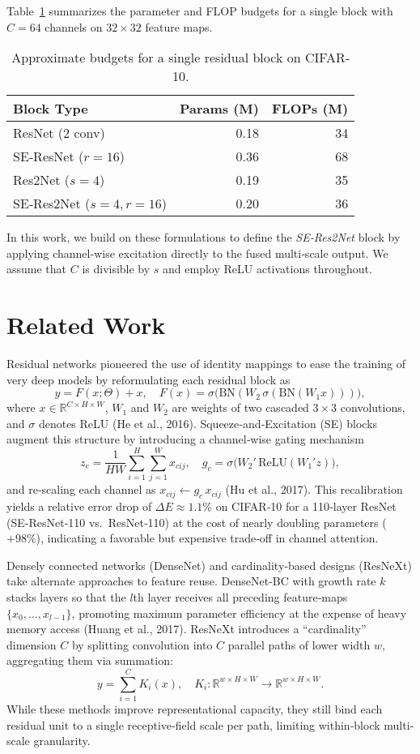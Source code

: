 \documentclass{article}
\begin{document}
Table~\ref{tab:budgets} summarizes the parameter and FLOP budgets for a single block with \(C=64\) channels on \(32\times32\) feature maps.

\begin{table}[h]
\centering
\begin{tabular}{lrr}
\hline
Block Type             & Params (M) & FLOPs (M) \\
\hline
ResNet (2 conv)        & 0.18       & 34        \\
SE‐ResNet (\(r=16\))   & 0.36       & 68        \\
Res2Net (\(s=4\))      & 0.19       & 35        \\
SE‐Res2Net (\(s=4,r=16\)) & 0.20    & 36        \\
\hline
\end{tabular}
\caption*{Approximate budgets for a single residual block on CIFAR‐10.}
\label{tab:budgets}
\end{table}

In this work, we build on these formulations to define the \emph{SE‐Res2Net} block by applying channel‐wise excitation directly to the fused multi‐scale output.  We assume that \(C\) is divisible by \(s\) and employ ReLU activations throughout.

\section{Related Work}
Residual networks pioneered the use of identity mappings to ease the training of very deep models by reformulating each residual block as
\[
y = F(x; \Theta) + x,\quad F(x)=\sigma\bigl(\mathrm{BN}(W_2\,\sigma(\mathrm{BN}(W_1 x)))\bigr),
\]
where \(x\in\mathbb{R}^{C\times H\times W}\), \(W_1\) and \(W_2\) are weights of two cascaded \(3\times3\) convolutions, and \(\sigma\) denotes ReLU (He et al., 2016).  Squeeze‐and‐Excitation (SE) blocks augment this structure by introducing a channel‐wise gating mechanism
\[
z_c = \frac{1}{H W}\sum_{i=1}^H\sum_{j=1}^W x_{cij},\quad g_c=\sigma\bigl(W_2'\,\mathrm{ReLU}(W_1'z)\bigr),
\]
and re‐scaling each channel as \(x_{cij}\leftarrow g_c\,x_{cij}\) (Hu et al., 2017).  This recalibration yields a relative error drop of \(\Delta E\approx1.1\)\% on CIFAR‐10 for a 110‐layer ResNet (SE‐ResNet‐110 vs.\ ResNet‐110) at the cost of nearly doubling parameters (\(+98\%\)), indicating a favorable but expensive trade‐off in channel attention.

Densely connected networks (DenseNet) and cardinality‐based designs (ResNeXt) take alternate approaches to feature reuse.  DenseNet‐BC with growth rate \(k\) stacks layers so that the \(l\)th layer receives all preceding feature‐maps \(\{x_0,\dots,x_{l-1}\}\), promoting maximum parameter efficiency at the expense of heavy memory access (Huang et al., 2017).  ResNeXt introduces a “cardinality” dimension \(C\) by splitting convolution into \(C\) parallel paths of lower width \(w\), aggregating them via summation:
\[
y = \sum_{i=1}^C K_i(x),\quad K_i:\mathbb{R}^{w\times H\times W}\to\mathbb{R}^{w\times H\times W}.
\]
While these methods improve representational capacity, they still bind each residual unit to a single receptive‐field scale per path, limiting within‐block multi‐scale granularity.
\end{document}

